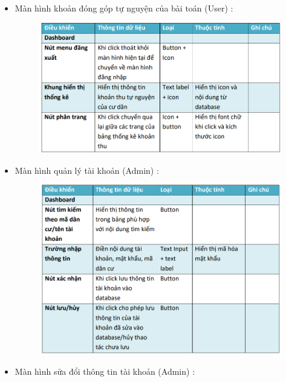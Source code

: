\documentclass{article}
\begin{document}
\begin{itemize}
\begin{figure}[H]
    \end{figure}
    \vspace{2cm}
    \item Màn hình khoản đóng góp tự nguyện của bài toán (User) :
    \begin{figure}[H]
        \centering
        \includegraphics[width=1\textwidth]{Ảnh chương 4/Tình nguyện User.png}
    \end{figure}
    \vspace{2cm}
    \item Màn hình quản lý tài khoản (Admin) :
    \begin{figure}[H]
        \centering
        \includegraphics[width=1\textwidth]{Ảnh chương 4/Quản lý tài khoản Admin.png}
    \end{figure}
    \vspace{2cm}
    \item Màn hình sửa đổi thông tin tài khoản (Admin) :
    \begin{figure}[H]
        \centering

\end{figure}
\end{itemize}
\end{document}
